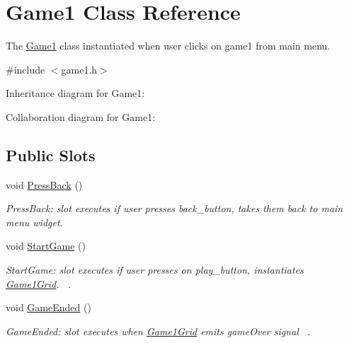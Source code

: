 \hypertarget{classGame1}{}\section{Game1 Class Reference}
\label{classGame1}


The \hyperlink{classGame1}{Game1} class instantiated when user clicks on game1 from main menu.  




{\ttfamily \#include $<$game1.\+h$>$}



Inheritance diagram for Game1\+:


Collaboration diagram for Game1\+:
\subsection*{Public Slots}
\begin{DoxyCompactItemize}
\item 
\mbox{\label{classGame1_aa236d689febb1eac426293350c991eb2}} 
void \hyperlink{classGame1_aa236d689febb1eac426293350c991eb2}{Press\+Back} ()
\begin{DoxyCompactList}\small\item\em Press\+Back\+: slot executes if user presses back\+\_\+button, takes them back to main menu widget. \end{DoxyCompactList}\item 
void \hyperlink{classGame1_aaba43ec7b8b814a74dd701e4502c40bb}{Start\+Game} ()
\begin{DoxyCompactList}\small\item\em Start\+Game\+: slot executes if user presses on play\+\_\+button, instantiates \hyperlink{classGame1Grid}{Game1\+Grid}.~\newline
. \end{DoxyCompactList}\item 
void \hyperlink{classGame1_acdc8a02eea6d4e76d60b655b30dd601f}{Game\+Ended} ()
\begin{DoxyCompactList}\small\item\em Game\+Ended\+: slot executes when \hyperlink{classGame1Grid}{Game1\+Grid} emits game\+Over signal~\newline
. \end{DoxyCompactList}\end{DoxyCompactItemize}
